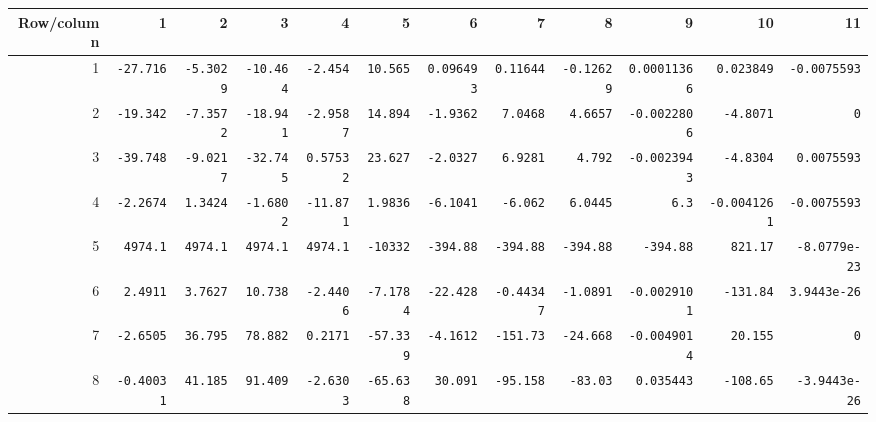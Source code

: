 \begin{landscape}
\begingroup\scriptsize\setlength{\tabcolsep}{3pt}\centering
\begin{tabular}{rrrrrrrrrrrr}\toprule

Row/column & 1 & 2 & 3 & 4 & 5 & 6 & 7 & 8 & 9 & 10 & 11 \\ \midrule

1 & \texttt{-27.716} & \texttt{-5.3029} & \texttt{-10.464} & \texttt{-2.454} & \texttt{10.565} & \texttt{0.096493} & \texttt{0.11644} & \texttt{-0.12629} & \texttt{0.00011366} & \texttt{0.023849} & \texttt{-0.0075593} \\

2 & \texttt{-19.342} & \texttt{-7.3572} & \texttt{-18.941} & \texttt{-2.9587} & \texttt{14.894} & \texttt{-1.9362} & \texttt{7.0468} & \texttt{4.6657} & \texttt{-0.0022806} & \texttt{-4.8071} & \texttt{0} \\

3 & \texttt{-39.748} & \texttt{-9.0217} & \texttt{-32.745} & \texttt{0.57532} & \texttt{23.627} & \texttt{-2.0327} & \texttt{6.9281} & \texttt{4.792} & \texttt{-0.0023943} & \texttt{-4.8304} & \texttt{0.0075593} \\

4 & \texttt{-2.2674} & \texttt{1.3424} & \texttt{-1.6802} & \texttt{-11.871} & \texttt{1.9836} & \texttt{-6.1041} & \texttt{-6.062} & \texttt{6.0445} & \texttt{6.3} & \texttt{-0.0041261} & \texttt{-0.0075593} \\

5 & \texttt{4974.1} & \texttt{4974.1} & \texttt{4974.1} & \texttt{4974.1} & \texttt{-10332} & \texttt{-394.88} & \texttt{-394.88} & \texttt{-394.88} & \texttt{-394.88} & \texttt{821.17} & \texttt{-8.0779e-23} \\

6 & \texttt{2.4911} & \texttt{3.7627} & \texttt{10.738} & \texttt{-2.4406} & \texttt{-7.1784} & \texttt{-22.428} & \texttt{-0.44347} & \texttt{-1.0891} & \texttt{-0.0029101} & \texttt{-131.84} & \texttt{3.9443e-26} \\

7 & \texttt{-2.6505} & \texttt{36.795} & \texttt{78.882} & \texttt{0.2171} & \texttt{-57.339} & \texttt{-4.1612} & \texttt{-151.73} & \texttt{-24.668} & \texttt{-0.0049014} & \texttt{20.155} & \texttt{0} \\

8 & \texttt{-0.40031} & \texttt{41.185} & \texttt{91.409} & \texttt{-2.6303} & \texttt{-65.638} & \texttt{30.091} & \texttt{-95.158} & \texttt{-83.03} & \texttt{0.035443} & \texttt{-108.65} & \texttt{-3.9443e-26} \\


\end{tabular}
\end{landscape}
